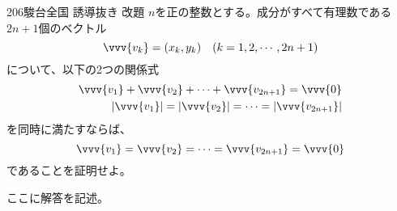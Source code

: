 \begin{thm}{206}{}{駿台全国 誘導抜き 改題}
 $n$を正の整数とする。成分がすべて有理数である$2n+1$個のベクトル
 \[ \vvv{v_k}=(x_k,y_k) \quad (k=1, 2, \cdots, 2n+1) \]
 について、以下の2つの関係式
 \begin{align*}
  \vvv{v_1}+\vvv{v_2}+\cdots+\vvv{v_{2n+1}}=\vvv{0} \\
  |\vvv{v_1}|=|\vvv{v_2}|=\cdots=|\vvv{v_{2n+1}}|
 \end{align*}
 を同時に満たすならば、
 \[ \vvv{v_1}=\vvv{v_2}=\cdots=\vvv{v_{2n+1}}=\vvv{0} \]
 であることを証明せよ。
\end{thm}

ここに解答を記述。